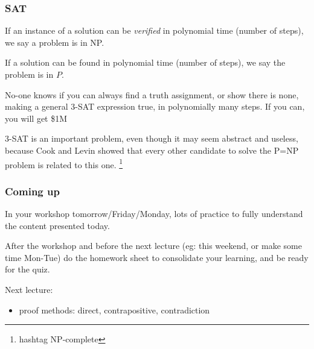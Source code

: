 \documentclass[10pt]{beamer}
\theoremstyle{definition}
\begin{document}
\begin{frame}
\frametitle{SAT}


 If an instance of a solution can be {\em verified} in polynomial time (number of steps), we say a problem is in NP.
 
\bigskip
If a solution can be found in polynomial time (number of steps), we say the problem is in $P$. 

\bigskip\pause
No-one knows if you can always find a truth assignment, or show there is none, making a general $3$-SAT expression true, in polynomially many steps. If you can, you will get \$1M %

\bigskip
$3$-SAT is an important problem, even though it may seem abstract and useless, because Cook and Levin showed that every other candidate to solve the P=NP problem is related to this one. \footnote{hashtag NP-complete}%


\vspace{1cm}
\vfill
\end{frame}




\begin{frame}
\frametitle{Coming up}


In your workshop tomorrow/Friday/Monday, lots of practice to fully understand the content presented today. 
\bigskip

After the workshop and before the next lecture (eg: this weekend, or make some time Mon-Tue)
do the homework sheet to consolidate your learning, and be ready for the quiz.

\bigskip
Next lecture: 
\begin{itemize}
 \item proof methods: direct, contrapositive, contradiction

 \end{itemize}




\vspace{2cm}
\vfill
\end{frame}
\end{document}
